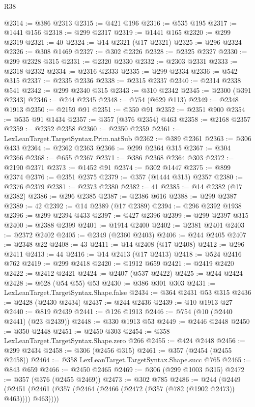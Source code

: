 \begin{lexlean}{R38}
\begin{coremodule}
@2314 := @386 @2313
@2315 := @421 @196
@2316 := @535 @195
@2317 := @1441 @156
@2318 := @299 @2317
@2319 := @1441 @165
@2320 := @299 @2319
@2321 := 40
@2324 := @14 @2321 (@17 @2321)
@2325 := @296 @2324
@2326 := @308 @1469
@2327 := @302 @2326
@2328 := @2325 @2327
@2330 := @299 @2328 @315
@2331 := @2320 @2330
@2332 := @2303 @2331
@2333 := @2318 @2332
@2334 := @2316 @2333
@2335 := @299 @2334
@2336 := @542 @315
@2337 := @2335 @2336
@2338 := @2315 @2337
@2340 := @2314 @2338 @541
@2342 := @299 @2340 @315
@2343 := @310 @2342
@2345 := @2300 (@391 @2343)
@2346 := @244 @2345
@2348 := @754 (@629 @113)
@2349 := @2348 @1913
@2350 := @2159 @91
@2351 := @350 @91
@2352 := @2351 @900
@2354 := @535 @91 @1434
@2357 := @357 (@376 @2354) @463
@2358 := @2168 @2357
@2359 := @2352 @2358
@2360 := @2350 @2359
@2361 := LexLeanTarget.TargetSyntax.Prim.natSub
@2362 := @389 @2361
@2363 := @306 @433
@2364 := @2362 @2363
@2366 := @299 @2364 @315
@2367 := @304 @2366
@2368 := @655 @2367
@2371 := @386 @2368 @2364 @303
@2372 := @2190 @2371
@2373 := @1452 @91
@2374 := @302 @1447
@2375 := @899 @2374
@2376 := @2351 @2375
@2379 := @357 (@1444 @313) @2357
@2380 := @2376 @2379
@2381 := @2373 @2380
@2382 := 41
@2385 := @14 @2382 (@17 @2382)
@2386 := @296 @2385
@2387 := @2386 @616
@2388 := @299 @2387
@2389 := 42
@2392 := @14 @2389 (@17 @2389)
@2394 := @296 @2392 @1938
@2396 := @299 @2394 @433
@2397 := @427 @2396
@2399 := @299 @2397 @315
@2400 := @2388 @2399
@2401 := @1914 @2400
@2402 := @2381 @2401
@2403 := @2372 @2402
@2405 := @2349 (@2360 @2403)
@2406 := @244 @2405
@2407 := @2348 @22
@2408 := 43
@2411 := @14 @2408 (@17 @2408)
@2412 := @296 @2411
@2413 := 44
@2416 := @14 @2413 (@17 @2413)
@2418 := @524 @2416 @762
@2419 := @299 @2418
@2420 := @1912 @659
@2421 := @2419 @2420
@2422 := @2412 @2421
@2424 := @2407 (@537 @2422)
@2425 := @244 @2424
@2428 := @628 (@54 @55) @53
@2430 := @386 @301 @303
@2431 := LexLeanTarget.TargetSyntax.Shape.false
@2434 := @364 @2431 @53 @315
@2436 := @2428 (@2430 @2434)
@2437 := @244 @2436
@2439 := @10 @1913 @27
@2440 := @819 @2439
@2441 := @126 @1913
@2446 := @754 (@10 (@2440 @2441) (@23 @2439))
@2448 := @330 @1913 @53
@2449 := @2446 @2448
@2450 := @350 @2448
@2451 := @2450 @303
@2454 := @358 LexLeanTarget.TargetSyntax.Shape.zero @266
@2455 := @424 @2448
@2456 := @299 @2434
@2458 := @306 (@2456 @315)
@2461 := @357 (@2454 (@2455 @2458))
@2464 := @358 LexLeanTarget.TargetSyntax.Shape.succ @765
@2465 := @843 @659
@2466 := @2450 @2465
@2469 := @306 (@299 @1003 @315)
@2472 := @357 (@376 (@2455 @2469))
@2473 := @302 @785
@2486 := @244
    (@2449 (@2451 (@2461 (@357 (@2464 (@2466 (@2472 (@357 (@782 (@1902 @2473)) @463)))) @463))))

\end{coremodule}
\end{lexlean}
